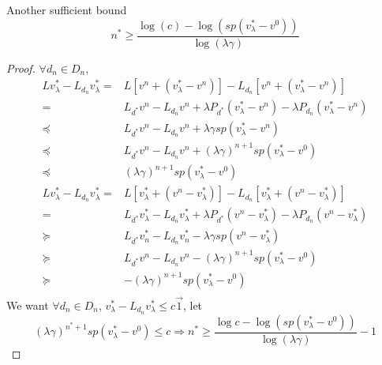 \begin{proposition}
    Another sufficient bound
    \[
        n^* \ge \frac{ \log(c) - \log(sp(v^*_\lambda - v^0))}{ \log (\lambda \gamma)} 
    \]
    \begin{proof} $ \forall d_n \in D_n $,
        \begin{align*}
            Lv^{*}_{\lambda} - L_{d_n} v^{*}_{\lambda}
            =& L\left[ v^n + (v^*_{\lambda} - v^n) \right] - L_{d_n}\left[ v^n + (v^*_{\lambda} - v^n) \right]\\
            =& L_{d^*} v^n - L_{d_n} v^n + \lambda P_{d^*} (v^{*}_{\lambda} - v^n) - \lambda P_{d_n} (v^*_{\lambda} - v^n)\\
            \preceq& L_{d^*}v^n - L_{d_n} v^n + \lambda \gamma sp(v^*_{\lambda} - v^n)\\
            \preceq&  L_{d^*}v^n - L_{d_n} v^n + {(\lambda \gamma)}^{n+1} sp(v^*_{\lambda} - v^0)\\
            \preceq& {(\lambda \gamma)}^{n+1} sp(v^*_{\lambda} - v^0)
        \end{align*}
        \begin{align*}
            Lv^{*}_{\lambda} - L_{d_n} v^{*}_{\lambda}
            =& L\left[ v^*_{\lambda} + (v^n - v^*_{\lambda}) \right] - L_{d_n}\left[ v^*_{\lambda} + (v^n - v^*_{\lambda}) \right]\\
            =& L_{d^*} v^*_\lambda - L_{d_n} v^{*}_{\lambda} + \lambda P_{d^*} ( v^n - v^{*}_{\lambda}) - \lambda P_{d_n} ( v^n - v^*_{\lambda})\\
            \succeq& L_{d^*}v^*_{n} - L_{d_n} v^*_{n} - \lambda \gamma sp(v^n - v^*_{\lambda})\\
            \succeq&  L_{d^*}v^n - L_{d_n} v^n - {(\lambda \gamma)}^{n+1} sp(v^*_{\lambda} - v^0)\\
            \succeq& - {(\lambda \gamma)}^{n+1} sp(v^*_{\lambda} - v^0)\\
        \end{align*}
        We want $ \forall d_n \in D_n $, $ v^*_{\lambda} - L_{d_n} v^*_{\lambda} \le c \vec{1} $, let
        \[
            {(\lambda \gamma)}^{n^*+1} sp(v^*_{\lambda} - v^0) \le c
            \Rightarrow n^* \ge  \frac{\log c - \log(sp(v^*_{\lambda} - v^0))}{ \log(\lambda \gamma)} - 1
        \]
    \end{proof}
\end{proposition}
